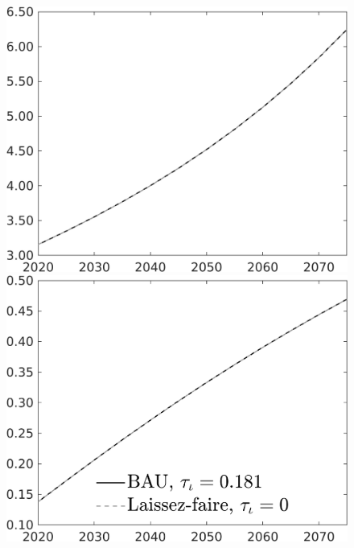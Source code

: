 \documentclass[12pt]{article}
\begin{document}
\begin{figure}[h!!]
\begin{minipage}[]{0.32\textwidth}
	\end{minipage}	
	\begin{minipage}[]{0.32\textwidth}
		\includegraphics[width=1\textwidth]{../../codding_model/own_basedOnFried/optimalPol_010922_revision/figures/all_13Sept22/CompTaul_Equlab_LFBAU_Reg0_wh_spillover0_nsk1_xgr1_knspil0_sep1_countec0_GovRev0_etaa0.79_lgd0.png}
	\end{minipage}	
	\begin{minipage}[]{0.32\textwidth}
		\includegraphics[width=1\textwidth]{../../codding_model/own_basedOnFried/optimalPol_010922_revision/figures/all_13Sept22/CompTaul_Equlab_LFBAU_Reg0_GFF_spillover0_nsk1_xgr1_knspil0_sep1_countec0_GovRev0_etaa0.79_lgd1.png}

\end{minipage}
\end{figure}
\end{document}
